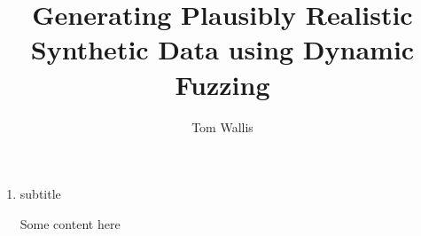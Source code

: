 \documentclass[a4paper,draft]{glasgowthesis}
\author{Tom Wallis}
\date{}
\title{Generating Plausibly Realistic Synthetic Data using Dynamic Fuzzing}
\begin{document}
\maketitle
\tableofcontents



\begin{enumerate}
\item subtitle
\label{sec:orgaa6c2c3}

Some content here
\end{enumerate}
\end{document}
